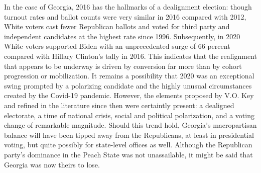 In the case of Georgia, 2016 has the hallmarks of a dealignment election: though turnout rates and ballot counts were very similar in 2016 compared with 2012, White voters cast fewer Republican ballots and voted for third party and independent candidates at the highest rate since 1996. Subsequently, in 2020 White voters supported Biden with an unprecedented surge of 66 percent compared with Hillary Clinton's tally in 2016. This indicates that the realignment that appears to be underway is driven by conversion far more than by cohort progression or mobilization. It remains a possibility that 2020 was an exceptional swing prompted by a polarizing candidate and the highly unusual circumstances created by the Covid-19 pandemic. However, the elements proposed by V.O. Key and refined in the literature since then were certaintly present: a dealigned electorate, a time of national crisis, social and political polarization, and a voting change of remarkable magnitude. Should this trend hold, Georgia's macropartisan balance will have been tipped away from the Republicans, at least in presidential voting, but quite possibly for state-level offices as well. Although the Republican party's dominance in the Peach State was not unassailable, it might be said that Georgia was now theirs to lose.  





